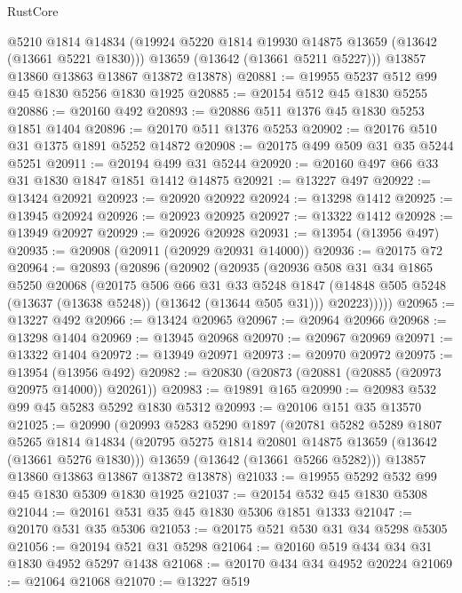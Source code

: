 \begin{lexlean}{RustCore}
\begin{coremodule}
        @5210
        @1814
        @14834
        (@19924 @5220 @1814 @19930 @14875 @13659 (@13642 (@13661 @5221 @1830)))
        @13659
        (@13642 (@13661 @5211 @5227)))
      @13857
      @13860
      @13863
      @13867
      @13872
      @13878)
@20881 := @19955 @5237 @512 @99 @45 @1830 @5256 @1830 @1925
@20885 := @20154 @512 @45 @1830 @5255
@20886 := @20160 @492
@20893 := @20886 @511 @1376 @45 @1830 @5253 @1851 @1404
@20896 := @20170 @511 @1376 @5253
@20902 := @20176 @510 @31 @1375 @1891 @5252 @14872
@20908 := @20175 @499 @509 @31 @35 @5244 @5251
@20911 := @20194 @499 @31 @5244
@20920 := @20160 @497 @66 @33 @31 @1830 @1847 @1851 @1412 @14875
@20921 := @13227 @497
@20922 := @13424 @20921
@20923 := @20920 @20922
@20924 := @13298 @1412
@20925 := @13945 @20924
@20926 := @20923 @20925
@20927 := @13322 @1412
@20928 := @13949 @20927
@20929 := @20926 @20928
@20931 := @13954 (@13956 @497)
@20935 := @20908 (@20911 (@20929 @20931 @14000))
@20936 := @20175 @72
@20964 := @20893
    (@20896
      (@20902
        (@20935
          (@20936
            @508
            @31
            @34
            @1865
            @5250
            @20068
            (@20175
              @506
              @66
              @31
              @33
              @5248
              @1847
              (@14848 @505 @5248 (@13637 (@13638 @5248)) (@13642 (@13644 @505 @31)))
              @20223)))))
@20965 := @13227 @492
@20966 := @13424 @20965
@20967 := @20964 @20966
@20968 := @13298 @1404
@20969 := @13945 @20968
@20970 := @20967 @20969
@20971 := @13322 @1404
@20972 := @13949 @20971
@20973 := @20970 @20972
@20975 := @13954 (@13956 @492)
@20982 := @20830 (@20873 (@20881 (@20885 (@20973 @20975 @14000)) @20261))
@20983 := @19891 @165
@20990 := @20983 @532 @99 @45 @5283 @5292 @1830 @5312
@20993 := @20106 @151 @35 @13570
@21025 := @20990
    (@20993
      @5283
      @5290
      @1897
      (@20781
        @5282
        @5289
        @1807
        @5265
        @1814
        @14834
        (@20795 @5275 @1814 @20801 @14875 @13659 (@13642 (@13661 @5276 @1830)))
        @13659
        (@13642 (@13661 @5266 @5282)))
      @13857
      @13860
      @13863
      @13867
      @13872
      @13878)
@21033 := @19955 @5292 @532 @99 @45 @1830 @5309 @1830 @1925
@21037 := @20154 @532 @45 @1830 @5308
@21044 := @20161 @531 @35 @45 @1830 @5306 @1851 @1333
@21047 := @20170 @531 @35 @5306
@21053 := @20175 @521 @530 @31 @34 @5298 @5305
@21056 := @20194 @521 @31 @5298
@21064 := @20160 @519 @434 @34 @31 @1830 @4952 @5297 @1438
@21068 := @20170 @434 @34 @4952 @20224
@21069 := @21064 @21068
@21070 := @13227 @519

\end{coremodule}
\end{lexlean}
